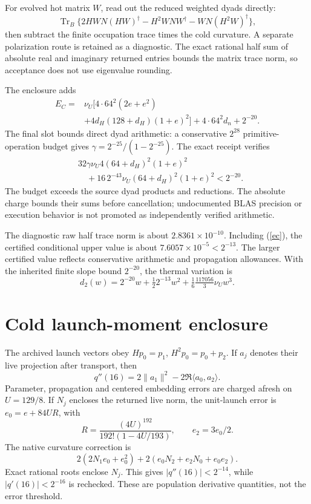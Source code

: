 \documentclass[a4paper,journal]{IEEEtran}
\newcommand{\Tr}{\operatorname{Tr}}\newcommand{\ad}{\operatorname{ad}}
\begin{document}
For evolved hot matrix $W$, read out the reduced weighted dyads directly:
\begin{equation}\Tr_B\{2HWN(HW)^\dagger-H^2WN W^\dagger-WN(H^2W)^\dagger\},\end{equation}
then subtract the finite occupation trace times the cold curvature. A separate polarization route is retained as a diagnostic. The exact rational half sum of absolute real and imaginary returned entries bounds the matrix trace norm, so acceptance does not use eigenvalue rounding.

The enclosure adds
\begin{align}
E_C={}&\nu_U\big[4\cdot64^2(2e+e^2)\nonumber\\&+4d_H(128+d_H)(1+e)^2\big]+4\cdot64^2d_n+2^{-20}.\label{ec}
\end{align}
The final slot bounds direct dyad arithmetic: a conservative $2^{28}$ primitive-operation budget gives $\gamma=2^{-25}/(1-2^{-25})$. The exact receipt verifies
\begin{align}
&32\gamma\nu_U4(64+d_H)^2(1+e)^2\nonumber\\&\quad+16\,2^{-43}\nu_U(64+d_H)^2(1+e)^2<2^{-20}.
\end{align}
The budget exceeds the source dyad products and reductions. The absolute charge bounds their sums before cancellation; undocumented BLAS precision or execution behavior is not promoted as independently verified arithmetic.

The diagnostic raw half trace norm is about $2.8361\times10^{-10}$. Including (\ref{ec}), the certified conditional upper value is about $7.6057\times10^{-5}<2^{-13}$. The larger certified value reflects conservative arithmetic and propagation allowances. With the inherited finite slope bound $2^{-20}$, the thermal variation is
\begin{equation}d_2(w)=2^{-20}w+\tfrac12 2^{-13}w^2+\tfrac16\tfrac{117056}{3}\nu_U w^3.\label{d2}\end{equation}
\section{Cold launch-moment enclosure}
The archived launch vectors obey $Hp_0=p_1$, $H^2p_0=p_0+p_2$. If $a_j$ denotes their live projection after transport, then
\begin{equation}q''(16)=2\|a_1\|^2-2\Re\langle a_0,a_2\rangle.\end{equation}
Parameter, propagation and centered embedding errors are charged afresh on $U=129/8$. If $N_j$ encloses the returned live norm, the unit-launch error is $e_0=e+84UR$, with
\begin{equation}R=\frac{(4U)^{192}}{192!(1-4U/193)},\qquad e_2=3e_0/2.\end{equation}
The native curvature correction is
\begin{equation}2(2N_1e_0+e_0^2)+2(e_0N_2+e_2N_0+e_0e_2).
\end{equation}
Exact rational roots enclose $N_j$. This gives $|q''(16)|<2^{-14}$, while $|q'(16)|<2^{-16}$ is rechecked. These are population derivative quantities, not the error threshold.
\end{document}
